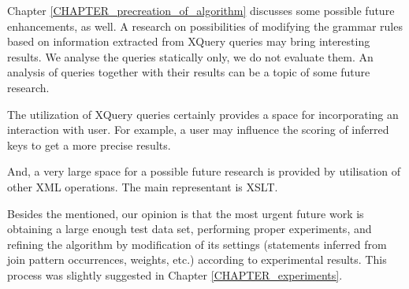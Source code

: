 Chapter \ref{CHAPTER_precreation_of_algorithm} discusses some possible future enhancements, as well. A research on possibilities of modifying the grammar rules based on information extracted from XQuery queries may bring interesting results. We analyse the queries statically only, we do not evaluate them. An analysis of queries together with their results can be a topic of some future research.

The utilization of XQuery queries certainly provides a space for incorporating an interaction with user. For example, a user may influence the scoring of inferred keys to get a more precise results.

And, a very large space for a possible future research is provided by utilisation of other XML operations. The main representant is XSLT.

Besides the mentioned, our opinion is that the most urgent future work is obtaining a large enough test data set, performing proper experiments, and refining the algorithm by modification of its settings (statements inferred from join pattern occurrences, weights, etc.) according to experimental results. This process was slightly suggested in Chapter \ref{CHAPTER_experiments}.